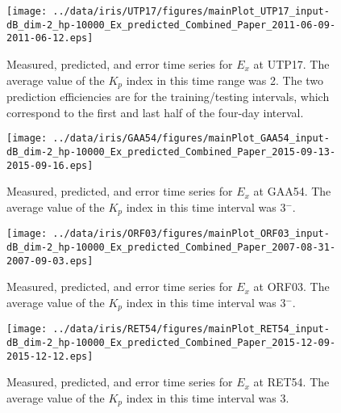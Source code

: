 \documentclass[12pt]{article}
\begin{document}
\clearpage
\begin{figure}[h]
\centering
\texttt{[image: ../data/iris/UTP17/figures/mainPlot\_UTP17\_input-dB\_dim-2\_hp-10000\_Ex\_predicted\_Combined\_Paper\_2011-06-09-2011-06-12.eps]}
\caption{Measured, predicted, and error time series for $E_x$ at UTP17. The average value of the $K_p$ index in this time range was 2.  The two prediction efficiencies are for the training/testing intervals, which correspond to the first and last half of the four-day interval.}
\label{figure:UTP17}
\end{figure}

\clearpage
\begin{figure}[h]
\centering
\texttt{[image: ../data/iris/GAA54/figures/mainPlot\_GAA54\_input-dB\_dim-2\_hp-10000\_Ex\_predicted\_Combined\_Paper\_2015-09-13-2015-09-16.eps]}
\caption{Measured, predicted, and error time series for $E_x$ at GAA54.  The average value of the $K_p$ index in this time interval was 3$^-$.}
\label{figure:GAA54}
\end{figure}

\clearpage
\begin{figure}[h]
\centering
\texttt{[image: ../data/iris/ORF03/figures/mainPlot\_ORF03\_input-dB\_dim-2\_hp-10000\_Ex\_predicted\_Combined\_Paper\_2007-08-31-2007-09-03.eps]}
\caption{Measured, predicted, and error time series for $E_x$ at ORF03. The average value of the $K_p$ index in this time interval was 3$^-$.}
\label{figure:ORF03}
\end{figure}


\clearpage
\begin{figure}[h]
\centering
\texttt{[image: ../data/iris/RET54/figures/mainPlot\_RET54\_input-dB\_dim-2\_hp-10000\_Ex\_predicted\_Combined\_Paper\_2015-12-09-2015-12-12.eps]}
\caption{Measured, predicted, and error time series for $E_x$ at RET54. The average value of the $K_p$ index in this time interval was 3.}
\label{figure:RET54}
\end{figure}
\end{document}
